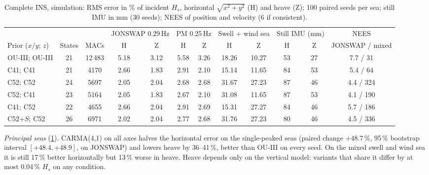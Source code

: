 \documentclass[conference]{IEEEtran}
\theoremstyle{bodysmall}
\begin{document}
\begin{table}[t]
\centering
\caption{Complete INS, simulation: RMS error in \% of incident $H_s$,
horizontal $\sqrt{x^2+y^2}$ (H) and heave (Z); 100 paired seeds per sea;
still IMU in mm (30 seeds); NEES of position and velocity (6 if
consistent).}
\label{tab:principal}
\footnotesize
\setlength{\tabcolsep}{4pt}
\begin{tabular}{@{}lccccccccccc@{}}
\toprule
& & & \multicolumn{2}{c}{JONSWAP 0.29\,Hz} & \multicolumn{2}{c}{PM 0.25\,Hz} &
\multicolumn{2}{c}{Swell + wind sea} & \multicolumn{2}{c}{Still IMU (mm)} & NEES\\
Prior ($x/y$; $z$) & States & MACs & H & Z & H & Z & H & Z & H & Z & JONSWAP / mixed\\
\midrule
OU-III; OU-III & 21 & 12\,483 & 5.18 & 3.12 & 5.58 & 3.26 & 18.26 & 10.27 & 53 & 27 & 7.7 / 31\\
C41; C41 & 21 & 4170 & 2.66 & 1.83 & 2.91 & 2.10 & 15.14 & 11.65 & 84 & 53 & 5.4 / 64\\
C52; C52 & 24 & 5697 & 2.05 & 2.04 & 2.68 & 2.68 & 31.67 & 27.23 & 87 & 46 & 4.4 / 324\\
C52; C41 & 23 & 5164 & 2.05 & 1.83 & 2.67 & 2.10 & 31.08 & 11.65 & 87 & 53 & 4.1 / 190\\
C41; C52 & 22 & 4655 & 2.66 & 2.04 & 2.91 & 2.69 & 15.31 & 27.27 & 84 & 46 & 5.7 / 186\\
C52+$S$; C52 & 26 & 6971 & 2.02 & 2.04 & 2.77 & 2.68 & 31.76 & 27.23 & 80 & 46 & 4.5 / 336\\
\bottomrule
\end{tabular}
\end{table}

\emph{Principal seas} (\cref{tab:principal}). CARMA(4,1) on all axes halves
the horizontal error on the single-peaked seas (paired change
$+48.7\,\%$, 95\,\% bootstrap interval $[+48.4,+48.9]$, on JONSWAP) and
lowers heave by 36--41\,\%, better than OU-III on every seed. On the mixed
swell and wind sea it is still 17\,\% better horizontally but 13\,\% worse in
heave. Heave depends only on the vertical model: variants that share it
differ by at most 0.04\,\% $H_s$ on any condition.
\end{document}
